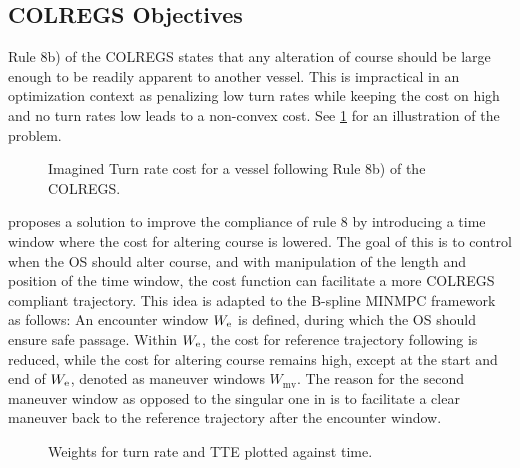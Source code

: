 \subsection{COLREGS Objectives}
Rule 8b) of the COLREGS states that any alteration of course should be large enough to be readily apparent to another vessel. This is impractical in an optimization context as penalizing low turn rates while keeping the cost on high and no turn rates low leads to a non-convex cost. See \cref{fig:turn-rate-cost} for an illustration of the problem. 

\begin{figure}
    \centering
    
    \caption{Imagined Turn rate cost for a vessel following Rule 8b) of the COLREGS.}
    \label{fig:turn-rate-cost}
\end{figure}

\cite{Thyri2022-MPC} proposes a solution to improve the compliance of rule 8 by introducing a time window where the cost for altering course is lowered. The goal of this is to control when the OS should alter course, and with manipulation of the length and position of the time window, the cost function can facilitate a more COLREGS compliant trajectory. This idea is adapted to the B-spline MINMPC framework as follows:
An encounter window $W_\text e$ is defined, during which the OS should ensure safe passage. Within $W_\text e$, the cost for reference trajectory following is reduced, while the cost for altering course remains high, except at the start and end of $W_\text e$, denoted as maneuver windows $W_\text{mv}$. 
The reason for the second maneuver window as opposed to the singular one in \cite{Thyri2022-MPC} is to facilitate a clear maneuver back to the reference trajectory after the encounter window.

\begin{figure}
    \centering
    
    \caption{Weights for turn rate and TTE plotted against time.}
    \label{fig:maneuver-window}
\end{figure}

